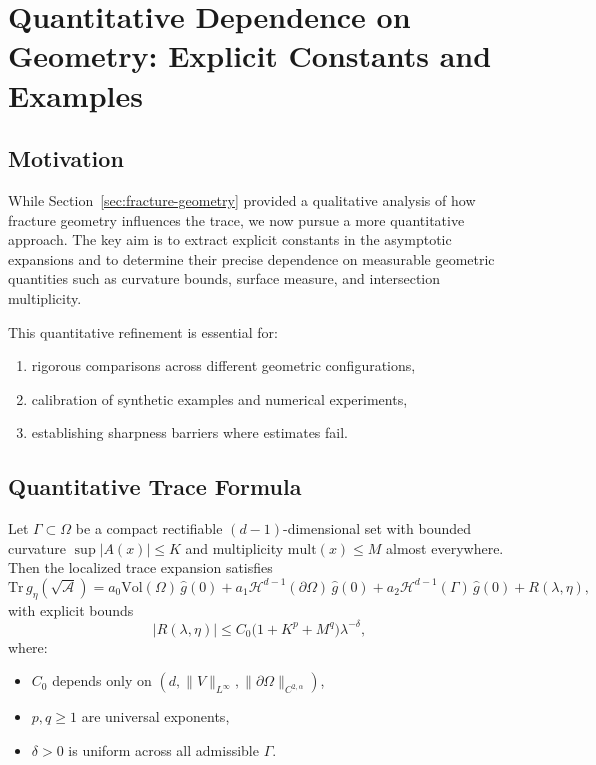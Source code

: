 \section{Quantitative Dependence on Geometry: Explicit Constants and Examples}
\label{sec:geometry-quantitative}

\subsection{Motivation}

While Section~\ref{sec:fracture-geometry} provided a qualitative analysis
of how fracture geometry influences the trace, we now pursue a more
quantitative approach.  
The key aim is to extract explicit constants in the asymptotic expansions
and to determine their precise dependence on measurable geometric
quantities such as curvature bounds, surface measure, and intersection
multiplicity.

This quantitative refinement is essential for:
\begin{enumerate}
  \item rigorous comparisons across different geometric configurations,
  \item calibration of synthetic examples and numerical experiments,
  \item establishing sharpness barriers where estimates fail.
\end{enumerate}

\subsection{Quantitative Trace Formula}

\begin{theorem}
\label{thm:quant-constants}
Let $\Gamma \subset \Omega$ be a compact rectifiable $(d-1)$-dimensional
set with bounded curvature $\sup |A(x)| \leq K$ and multiplicity
$\mathrm{mult}(x) \leq M$ almost everywhere.
Then the localized trace expansion satisfies
\[
\mathrm{Tr}\, g_\eta(\sqrt{\mathcal{A}}) =
a_0 \mathrm{Vol}(\Omega)\, \hat{g}(0) +
a_1 \mathcal{H}^{d-1}(\partial \Omega)\, \hat{g}(0) +
a_2 \mathcal{H}^{d-1}(\Gamma)\, \hat{g}(0) +
R(\lambda,\eta),
\]
with explicit bounds
\[
|R(\lambda,\eta)| \leq C_0
\bigl( 1+K^p + M^q \bigr)
\lambda^{-\delta},
\]
where:
\begin{itemize}
  \item $C_0$ depends only on $(d, \|V\|_{L^\infty},\|\partial\Omega\|_{C^{2,\alpha}})$,
  \item $p,q \geq 1$ are universal exponents,
  \item $\delta>0$ is uniform across all admissible $\Gamma$.
\end{itemize}
\end{theorem}


